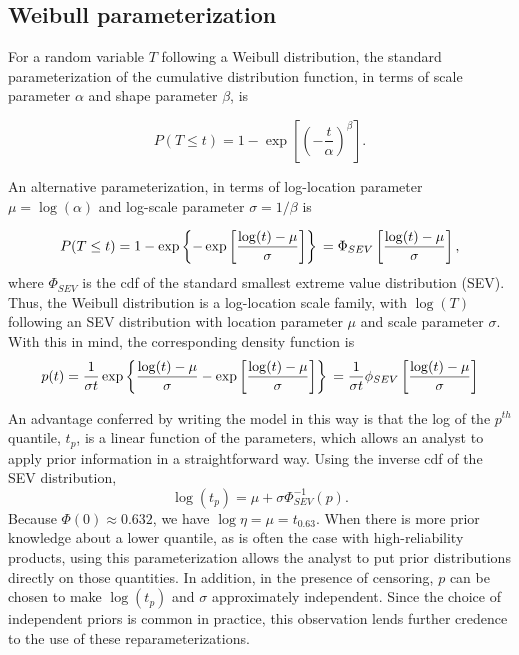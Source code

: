 \documentclass[12pt]{article}
\begin{document}
\subsection{Weibull parameterization}
\label{sec:Weibull parameterization}
For a random variable $T$ following a Weibull distribution, the standard parameterization of the cumulative distribution function, in terms of scale parameter $\alpha$ and shape parameter $\beta$, is

$$ P(T \le t) = 1 - \exp \left[ \left( -\frac{t}{\alpha} \right)^\beta \right]. $$

An alternative parameterization, in terms of log-location parameter $\mu = \log (\alpha)$ and log-scale parameter $\sigma = 1/\beta$ is

\begin{equation} P(T \le t) = 1 - \exp \left\{ -\exp \left[ \frac{ \log (t) - \mu }{\sigma} \right] \right\}\\
= \Phi_{SEV}\left[\frac{\log (t) - \mu}{\sigma}\right],
\end{equation}
where $\Phi_{SEV}$ is the cdf of the standard smallest extreme value distribution (SEV). Thus, the Weibull distribution is a log-location scale family, with $\log(T)$ following an SEV distribution with location parameter $\mu$ and scale parameter $\sigma$. With this in mind, the corresponding density function is
\begin{equation}
p(t) = \frac{1}{\sigma t}\exp\left\{\frac{\log(t) - \mu}{\sigma} - \exp \left[ \frac{\log(t) - \mu}{\sigma} \right]\right\}\\
=\frac{1}{\sigma t} \phi_{SEV}\left[\frac{\log(t) - \mu}{\sigma}\right]
\end{equation}

An advantage conferred by writing the model in this way is that the log of the $p^{th}$ quantile, $t_p$, is a linear function of the parameters, which allows an analyst to apply prior information in a straightforward way.  Using the inverse cdf of the SEV distribution,
\begin{equation}
\log(t_p) = \mu + \sigma \Phi_{SEV}^{-1}(p).
\end{equation}
Because $\Phi(0)\approx 0.632$, we have $\log{\eta} = \mu  =t_{0.63}$. When there is more prior knowledge about a lower quantile, as is often the case with high-reliability products, using this parameterization allows the analyst to put prior distributions directly on those quantities. In addition, in the presence of censoring, $p$ can be chosen to make $\log(t_p)$ and $\sigma$ approximately independent. Since the choice of independent priors is common in practice, this observation lends further credence to the use of these reparameterizations.
\end{document}

